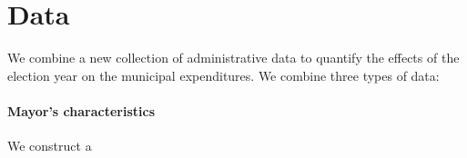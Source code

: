 \section{Data}

We combine a new collection of administrative data to quantify the effects of the election year on the municipal expenditures. We combine three types of data: 
\paragraph{Mayor's characteristics}
We construct a 